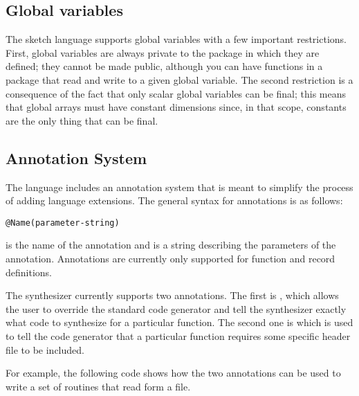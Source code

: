 \subsection{Global variables}
The sketch language supports global variables with a few important restrictions. First, global variables are always private to the package in which they are defined; they cannot be made public, although you can have functions in a package that read and write to a given global variable. The second restriction is a consequence of the fact that only scalar global variables can be final; this means that global arrays must have constant dimensions since, in that scope, constants are the only thing that can be final.


\subsection{Annotation System}
The \Sk{} language includes an annotation system that is meant to simplify the process of adding language extensions. The general syntax for annotations is as follows:
\begin{lstlisting}
@Name(parameter-string)
\end{lstlisting}
 is the name of the annotation and  is a string describing the parameters of the annotation. Annotations are currently only supported for function and record definitions. 

The synthesizer currently supports two annotations. The first is , which allows the user to override the standard code generator and tell the synthesizer exactly what code to synthesize for a particular function. The second one is  which is used to tell the code generator that a particular function requires some specific header file to be included.

For example, the following code shows how the two  annotations can be used to write a set of routines that read form a file.

